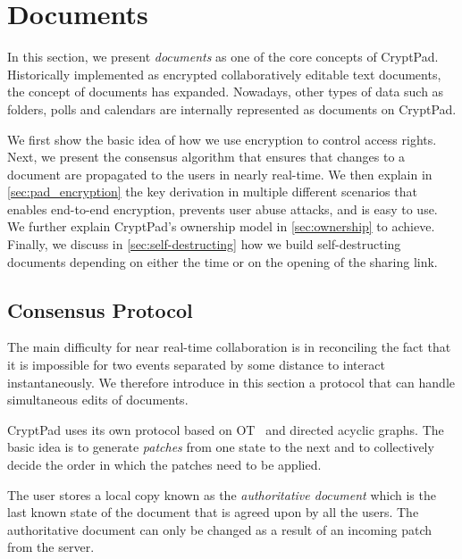 \section{Documents}
\label{sec:pads}
In this section, we present \textit{documents} as one of the core concepts of CryptPad.
Historically implemented as encrypted collaboratively editable text documents, the concept of documents has expanded.
Nowadays, other types of data such as folders, polls and calendars are internally represented as documents on CryptPad.

We first show the basic idea of how we use encryption to control access rights.
Next, we present the consensus algorithm that ensures that changes to a document are propagated to the users in nearly real-time.
We then explain in \cref{sec:pad_encryption} the key derivation in multiple different scenarios that enables end-to-end encryption, prevents user abuse attacks, and is easy to use.
We further explain CryptPad's ownership model in \cref{sec:ownership} to achieve.
Finally, we discuss in \cref{sec:self-destructing} how we build self-destructing documents depending on either the time or on the opening of the sharing link.

\subsection{Consensus Protocol}
\label{sec:consensus}

The main difficulty for near real-time collaboration is in reconciling the fact that it is impossible for two events separated by some distance to interact instantaneously.
We therefore introduce in this section a protocol that can handle simultaneous edits of documents.

CryptPad uses its own protocol based on \ac{OT}~\cite{Ellis1989} and directed acyclic graphs.
The basic idea is to generate \textit{patches} from one state to the next and to collectively decide the order in which the patches need to be applied.

The user stores a local copy known as the \textit{authoritative document} which is the last known state of the document that is agreed upon by all the users.
The authoritative document can only be changed as a result of an incoming patch from the server.

